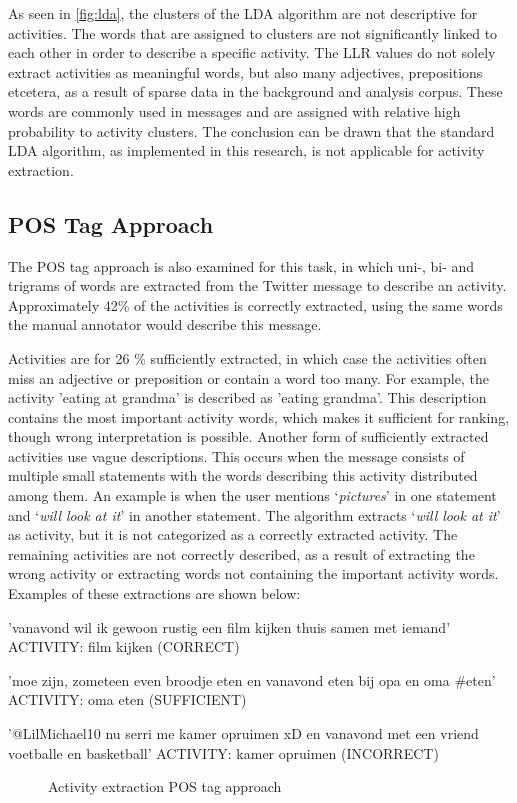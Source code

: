 As seen in \autoref{fig:lda}, the clusters of the LDA algorithm are not descriptive for activities. The words that are assigned to clusters are not significantly linked to each other in order to describe a specific activity. The LLR values do not solely extract activities as meaningful words, but also many adjectives, prepositions etcetera, as a result of sparse data in the background and analysis corpus. These words are commonly used in messages and are assigned with relative high probability to activity clusters. The conclusion can be drawn that the standard LDA algorithm, as implemented in this research, is not applicable for activity extraction.

\subsection{POS Tag Approach}
The POS tag approach is also examined for this task, in which uni-, bi- and trigrams of words are extracted from the Twitter message to describe an activity. Approximately 42\% of the activities is correctly extracted, using the same words the manual annotator would describe this message. 

Activities are for 26 \% sufficiently extracted, in which case the activities often miss an adjective or preposition or contain a word too many. For example, the activity 'eating at grandma' is described as 'eating grandma'. This description contains the most important activity words, which makes it sufficient for ranking, though wrong interpretation is possible. Another form of sufficiently extracted activities use vague descriptions. This occurs when the message consists of multiple small statements with the words describing this activity distributed among them. An example is when the user mentions `\textit{pictures}' in one statement and `\textit{will look at it}' in another statement. The algorithm extracts `\textit{will look at it}' as activity, but it is not categorized as a correctly extracted activity. The remaining activities are not correctly described, as a result of extracting the wrong activity or extracting words not containing the important activity words. Examples of these extractions are shown below:

\begin{verbbox}
'vanavond wil ik gewoon rustig een film kijken thuis samen 
met iemand'
ACTIVITY: film kijken (CORRECT)

'moe zijn, zometeen even broodje eten en vanavond eten bij 
opa en oma #eten'
ACTIVITY: oma eten (SUFFICIENT)

'@LilMichael10  nu serri me kamer opruimen xD en vanavond 
met een vriend voetballe en basketball'
ACTIVITY: kamer opruimen (INCORRECT)
\end{verbbox}
\begin{figure}
  \centering

\begin{framed}
  \theverbbox
\end{framed}
  \caption{Activity extraction POS tag approach}\label{fig:pos}
\end{figure}

